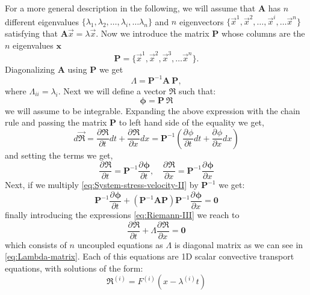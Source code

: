 \documentclass[preprint,12pt,a4paper]{elsarticle}
\newcommand{\tens}[1]{
  \ensuremath{\mathbf{{#1}}}
}
\newcommand{\Matrix}[1]{
  \ensuremath{\mathbf{{#1}}}
}
\newcommand{\Vector}[1]{
  \ensuremath{\mathbf{{#1}}}
}
\newcommand{\Deriv}[3][]{
  \ensuremath{\frac{\partial^{#1}{#2}}{ \partial {#3}^{#1} }}
}
\begin{document}
For a more general description in the following, we will assume that $\Matrix{A}$ has $n$
different eigenvalues $\{ \lambda_1, \lambda_2, \ldots, \lambda_i, \ldots
\lambda_n \}$ and $n$ eigenvectors $\{ \vec{x}^1, \vec{x}^2, \ldots,
\vec{x}^i, \ldots \vec{x}^n \}$ satisfying that $\tens{A} \vec{x} =
\lambda \vec{x} $. Now we introduce the matrix $\Matrix{P}$ whose columns are the $n$
eigenvalues $\Vector{x}$
\begin{equation}
  \label{eq:P-matrix}
\Matrix{P} = \{ \vec{x}^1, \vec{x}^2, \vec{x}^3, \ldots \vec{x}^n \}.
\end{equation}
Diagonalizing $\Matrix{A}$ using $\Matrix{P}$ we get
\begin{equation}
  \label{eq:Lambda-matrix}
  \Lambda = \Matrix{P}^{-1} \Matrix{A}\ \Matrix{P},
\end{equation}
where $ \Lambda_{ii} = \lambda_i$. Next we will define a vector $\Vector{\Re}$ such that:
\begin{equation}
  \label{eq:Riemann-definition}
  \Vector{\phi} = \Matrix{P}\ \Vector{\Re}
\end{equation}
we will assume to be integrable. Expanding the above expression with
the chain rule and passing the matrix $\Matrix{P}$ to left hand side
of the equality we get,
\begin{equation}
  \label{eq:Riemann-II}
  d \vec{\Vector{\Re}} = \Deriv{\Vector{\Re}}{t}dt + \Deriv{\Vector{\Re}}{x}dx =
  \tens{P}^{-1}\left(\Deriv{\phi}{t}dt + \Deriv{\phi}{x}dx \right)
\end{equation}
and setting the terms we get,
\begin{equation}
  \label{eq:Riemann-III}
  \Deriv{\Vector{\Re}}{t} = \Matrix{P}^{-1}\Deriv{\Vector{\phi}}{t},\quad 
  \Deriv{\Vector{\Re}}{x} = \Matrix{P}^{-1}\Deriv{\Vector{\phi}}{x}
\end{equation}
Next, if we multiply \eqref{eq:System-stress-velocity-II} by
$\Matrix{P}^{-1}$ we get:
\begin{equation}
  \label{eq:System-stress-velocity-III}
  \Matrix{P}^{-1}\Deriv{\Vector{\phi}}{t} + \left(\Matrix{P}^{-1}\Matrix{A}\Matrix{P}
  \right)\Matrix{P}^{-1} \Deriv{\Vector{\phi}}{x} = \Vector{0}
\end{equation}
finally introducing the expressions \eqref{eq:Riemann-III} we reach to
\begin{equation}
  \label{eq:System-stress-velocity-IV}
  \Deriv{\Vector{\Re}}{t} + \varLambda \Deriv{\Vector{\Re}}{x} = \Vector{0}  
\end{equation}
which consists of $n$ uncoupled equations as $\varLambda$ is
diagonal matrix as we can see in \eqref{eq:Lambda-matrix}. Each of this
equations are 1D scalar convective transport equations, with solutions
of the form:
\begin{equation}
  \label{eq:SystemEquations_sigma_v_VI}
  \Re^{(i)} = F^{(i)} \left(x - \lambda^{(i)} t \right)
\end{equation}
\end{document}
